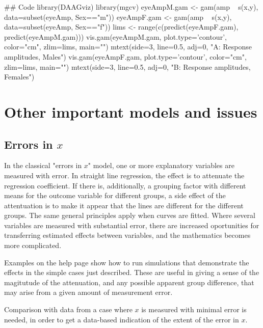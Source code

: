 \begin{fullwidth}

\begin{Schunk}
\begin{Sinput}
## Code
library(DAAGviz)
library(mgcv)
eyeAmpM.gam <- gam(amp ~ s(x,y), data=subset(eyeAmp, Sex=="m"))
eyeAmpF.gam <- gam(amp ~ s(x,y), data=subset(eyeAmp, Sex=="f"))
lims <- range(c(predict(eyeAmpF.gam), predict(eyeAmpM.gam)))
vis.gam(eyeAmpM.gam, plot.type='contour', color="cm", zlim=lims, main="")
mtext(side=3, line=0.5, adj=0, "A: Response amplitudes, Males")
vis.gam(eyeAmpF.gam, plot.type='contour', color="cm", zlim=lims, main="")
mtext(side=3, line=0.5, adj=0, "B: Response amplitudes, Females")
\end{Sinput}
\end{Schunk}

\end{fullwidth}

\section{Other important models and issues}

\subsection{Errors in $x$}
In the classical "errors in $x$" model, one or more explanatory variables
are measured with error.  In straight line regression, the effect is to
attenuate the regression coefficient.  If there is, additionally, a
grouping factor with different means for the outcome variable for different
groups, a side effect of the attentuation is to make it appear that the
lines are different for the different groups.  The same general principles
apply when curves are fitted.  Where several variables
are measured with substantial error, there are increased oportunities for
transferring estimated effects between variables, and the mathematics
becomes more complicated.

Examples on the help page  show how to run
simulations that demonstrate the effects in the simple cases just
described.  These are useful in giving a sense of the magitutude
of the attenuation, and any possible
apparent group difference, that may arise from a given amount of
measurement error.

Comparison with data from a case where $x$ is measured with minimal 
error is needed, in order to get a data-based indication of the extent
of the error in $x$.


